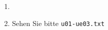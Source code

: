 \begin{enumerate}[label={Aufgabe H\arabic*},start=60]
    \item 
    \item Sehen Sie bitte \texttt{u01-ue03.txt}
\end{enumerate}